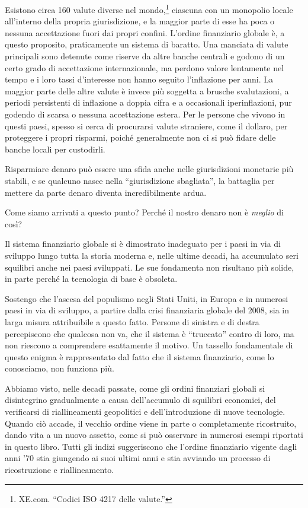 \documentclass[
  a5paper,
  smalldemyvopaper,10pt,twoside,onecolumn,openright,extrafontsizes,hidelinks]{memoir}
\begin{document}
Esistono circa 160 valute diverse nel mondo,\footnote{XE.com. ``Codici
  ISO 4217 delle valute.''} ciascuna con un monopolio locale all'interno
della propria giurisdizione, e la maggior parte di esse ha poca o
nessuna accettazione fuori dai propri confini. L'ordine finanziario
globale è, a questo proposito, praticamente un sistema di baratto. Una
manciata di valute principali sono detenute come riserve da altre banche
centrali e godono di un certo grado di accettazione internazionale, ma
perdono valore lentamente nel tempo e i loro tassi d'interesse non hanno
seguito l'inflazione per anni. La maggior parte delle altre valute è
invece più soggetta a brusche svalutazioni, a periodi persistenti di
inflazione a doppia cifra e a occasionali iperinflazioni, pur godendo di
scarsa o nessuna accettazione estera. Per le persone che vivono in
questi paesi, spesso si cerca di procurarsi valute straniere, come il
dollaro, per proteggere i propri risparmi, poiché generalmente non ci si
può fidare delle banche locali per custodirli.

Risparmiare denaro può essere una sfida anche nelle giurisdizioni
monetarie più stabili, e se qualcuno nasce nella ``giurisdizione
sbagliata'', la battaglia per mettere da parte denaro diventa
incredibilmente ardua.

Come siamo arrivati a questo punto? Perché il nostro denaro non è
\emph{meglio} di così?

Il sistema finanziario globale si è dimostrato inadeguato per i paesi in
via di sviluppo lungo tutta la storia moderna e, nelle ultime decadi, ha
accumulato seri squilibri anche nei paesi sviluppati. Le sue fondamenta
non risultano più solide, in parte perché la tecnologia di base è
obsoleta.

Sostengo che l'ascesa del populismo negli Stati Uniti, in Europa e in
numerosi paesi in via di sviluppo, a partire dalla crisi finanziaria
globale del 2008, sia in larga misura attribuibile a questo fatto.
Persone di sinistra e di destra percepiscono che qualcosa non va, che il
sistema è ``truccato'' contro di loro, ma non riescono a comprendere
esattamente il motivo. Un tassello fondamentale di questo enigma è
rappresentato dal fatto che il sistema finanziario, come lo conosciamo,
non funziona più.

Abbiamo visto, nelle decadi passate, come gli ordini finanziari globali
si disintegrino gradualmente a causa dell'accumulo di squilibri
economici, del verificarsi di riallineamenti geopolitici e
dell'introduzione di nuove tecnologie. Quando ciò accade, il vecchio
ordine viene in parte o completamente ricostruito, dando vita a un nuovo
assetto, come si può osservare in numerosi esempi riportati in questo
libro. Tutti gli indizi suggeriscono che l'ordine finanziario vigente
dagli anni '70 stia giungendo ai suoi ultimi anni e stia avviando un
processo di ricostruzione e riallineamento.
\end{document}
